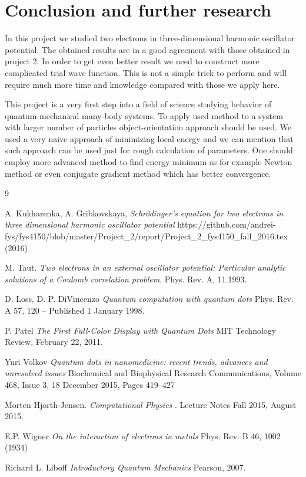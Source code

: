 \documentclass[10pt]{article}
\begin{document}
\newpage
\clearpage
\section{Conclusion and further research}\label{conc}
In this project we studied two electrons in three-dimensional harmonic oscillator potential. The obtained results are in a good agreement with those obtained in project 2. In order to get even better result we need to construct more complicated trial wave function. This is not a simple trick to perform and will require much more time and knowledge compared with those we apply here. 

This project is a very first step into a field of science studying behavior of quantum-mechanical many-body systems. To apply used method to a system with larger number of particles object-orientation approach should be used. We used a very naive approach of minimizing local energy and we can mention that such approach can be used just for rough calculation of parameters. One should employ more advanced method to find energy minimum as for example Newton method or even conjugate gradient method which has better convergence. 

\newpage

\begin{thebibliography} {9}

A. Kukharenka, A. Gribkovskaya,
\textit
{Schr\"{o}dinger's equation for two electrons in three dimensional harmonic oscillator potential
}
https://github.com/andrei-fys/fys4150/blob/master/Project\_2/report/Project\_2\_fys4150\_fall\_2016.tex (2016)


M. Taut. 
\textit{Two electrons in an external oscillator potential: Particular analytic solutions of a Coulomb correlation problem}.
Phys. Rev. A, 11.1993.


D. Loss, D. P. DiVincenzo
\textit{
Quantum computation with quantum dots
}
Phys. Rev. A 57, 120 – Published 1 January 1998.

P. Patel
\textit
{The First Full-Color Display with Quantum Dots
}
MIT Technology Review, February 22, 2011.

Yuri Volkov
\textit
{Quantum dots in nanomedicine: recent trends, advances and unresolved issues
}
Biochemical and Biophysical Research Communications, Volume 468, Issue 3, 18 December 2015, Pages 419–427

Morten Hjorth-Jensen. 
\textit{Computational Physics
}. 
Lecture Notes Fall 2015, August 2015.


E.P. Wigner
\textit
{On the interaction of electrons in metals
}
Phys. Rev. B 46, 1002 (1934) 

Richard L. Liboff
\textit
{Introductory Quantum Mechanics
}
Pearson, 2007.


\end{thebibliography}
\end{document}
